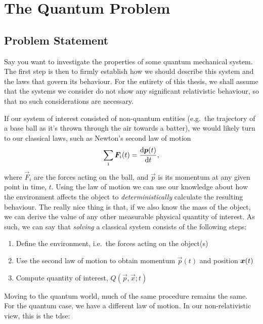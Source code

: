 \documentclass[Thesis.tex]{subfiles}
\begin{document}
\chapter{The Quantum Problem}
\label{chp:the-quantum-problem}


\section{Problem Statement}

Say you want to investigate the properties of some quantum
mechanical system. The first step is then to firmly establish how we should describe this
system and the laws that govern its behaviour. For the entirety of this thesis, we shall
assume that the systems we consider do not show any significant relativistic behaviour, so
that no such considerations are necessary.

If our system of interest consisted of non-quantum entities (e.g.\ the
trajectory of a base ball as it's thrown through the air towards a batter), we
would likely turn to our classical laws, such as Newton's second law of motion
%
\begin{align}
    \sum_i \bm{F}_i(t) = \dv{\bm{p}(t)}{t},
\end{align}
%
\noindent where $\vec F_i$ are the forces acting on the ball, and $\vec p$ is its momentum at
any given point in time, $t$. Using the law of motion we can use our knowledge about how the
environment affects the object to \emph{deterministically} calculate the resulting
behaviour. The really nice thing is that, if we also know the mass of the object, we
can derive the value of any other measurable physical quantity of interest. As such,
we can say that \emph{solving} a classical system consists of the following steps:

\begin{enumerate}
    \item Define the environment, i.e.\ the forces acting on the object(s)
    \item Use the second law of motion to obtain momentum $\vec p(t)$ and position $\bm{x}(t)$
    \item Compute quantity of interest, $Q(\vec p, \vec x; t)$
\end{enumerate}

Moving to the quantum world, much of the same procedure remains the same. For the quantum
case, we have a different law of motion. In our non-relativistic view, this is the
\gls{tdse}:
\end{document}
